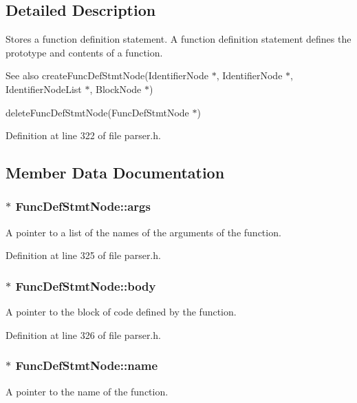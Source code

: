 \subsection{Detailed Description}
Stores a function definition statement. A function definition statement defines the prototype and contents of a function.

\begin{DoxySeeAlso}{See also}
create\-Func\-Def\-Stmt\-Node(\-Identifier\-Node $\ast$, Identifier\-Node $\ast$, Identifier\-Node\-List $\ast$, Block\-Node $\ast$) 

delete\-Func\-Def\-Stmt\-Node(\-Func\-Def\-Stmt\-Node $\ast$) 
\end{DoxySeeAlso}


Definition at line 322 of file parser.\-h.



\subsection{Member Data Documentation}
\hypertarget{struct_func_def_stmt_node_a2a9f4d580b7252e5576873d2252a187a}{
\subsubsection[{args}]{$\ast$ {\bf Func\-Def\-Stmt\-Node\-::args}}}\label{struct_func_def_stmt_node_a2a9f4d580b7252e5576873d2252a187a}
A pointer to a list of the names of the arguments of the function. 

Definition at line 325 of file parser.\-h.

\hypertarget{struct_func_def_stmt_node_a9e50b6a41f7abe43b433fe4fd714b002}{
\subsubsection[{body}]{$\ast$ {\bf Func\-Def\-Stmt\-Node\-::body}}}\label{struct_func_def_stmt_node_a9e50b6a41f7abe43b433fe4fd714b002}
A pointer to the block of code defined by the function. 

Definition at line 326 of file parser.\-h.

\hypertarget{struct_func_def_stmt_node_ab047936127219724532e25ba6890265a}{
\subsubsection[{name}]{$\ast$ {\bf Func\-Def\-Stmt\-Node\-::name}}}\label{struct_func_def_stmt_node_ab047936127219724532e25ba6890265a}
A pointer to the name of the function. 

